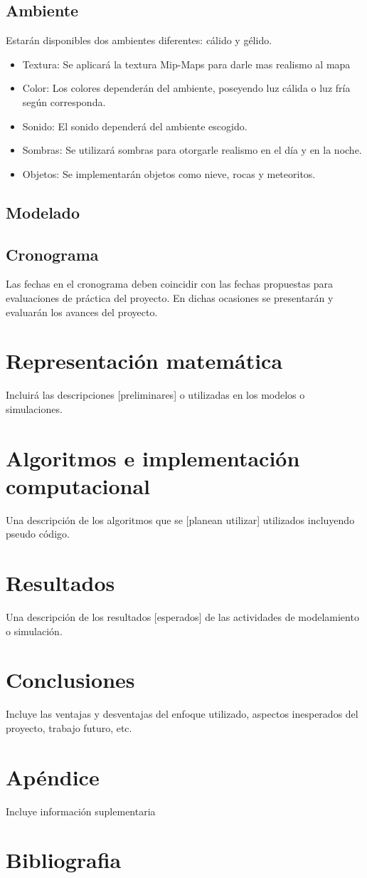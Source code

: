 \documentclass[a4paper]{article}
\begin{document}
\subsection{Ambiente}
Estarán disponibles dos ambientes diferentes: cálido y gélido.
\begin{itemize}
	\item Textura: Se aplicará la textura Mip-Maps para darle mas realismo al mapa
	\item Color: Los colores dependerán del ambiente, poseyendo luz cálida o luz fría según corresponda.
	\item Sonido: El sonido dependerá del ambiente escogido.
	\item Sombras: Se utilizará sombras para otorgarle realismo en el día y en la noche.
	\item Objetos: Se implementarán objetos como nieve, rocas y meteoritos.
	
\end{itemize}

\subsection{Modelado}

\subsection{Cronograma}

Las fechas en el cronograma deben coincidir con las fechas propuestas para evaluaciones de práctica del proyecto. En dichas ocasiones se presentarán y evaluarán los avances del proyecto.

\section{Representación matemática}
Incluirá las descripciones [preliminares] o utilizadas en los
modelos o simulaciones.
\section{Algoritmos e implementación computacional}
Una descripción de los algoritmos que se
[planean utilizar] utilizados incluyendo pseudo código.
\section{Resultados}
Una descripción de los resultados [esperados] de las actividades de
modelamiento o simulación.
\section{Conclusiones}
Incluye las ventajas y desventajas del enfoque utilizado, aspectos inesperados
del proyecto, trabajo futuro, etc.
\section{Apéndice}
Incluye información suplementaria
\section{Bibliografia}
\end{document}
